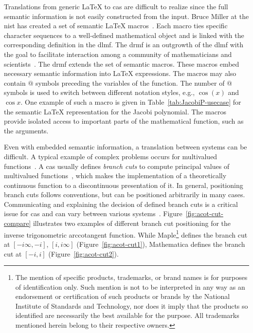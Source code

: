\documentclass[a4paper,11pt]{article}
\newcommand{\Maple}{Maple}
\newcommand{\Mathematica}{Mathematica}
\theoremstyle{defTheoStyle}
\theoremstyle{defExampStyle}
\DeclareRobustCommand{\iunit}{{i}}
\begin{document}
Translations from generic \LaTeX{} to \gls*{cas} are difficult to realize since the full semantic information is not easily constructed from the input. Bruce Miller at the \gls*{nist} has created a set of semantic \LaTeX{} macros~\parencite{DLMF:Macros}. Each macro ties specific character sequences to a well-defined mathematical object and is linked with the corresponding definition in the \gls*{dlmf}. The \gls*{drmf} is an outgrowth of the \gls*{dlmf} with the goal to facilitate interaction among a community of mathematicians and scientists~\parencites{DRMF:14}{DRMF:15}. The \gls*{drmf} extends the set of semantic macros. These macros embed necessary semantic information into \LaTeX{} expressions. The macros may also contain $@$ symbols preceding the variables of the function. The number of $@$ symbols is used to switch between different notation styles, e.g., $\cos(x)$ and $\cos x$. One example of such a macro is given in Table~\ref{tab:JacobiP-usecase} for the semantic \LaTeX{} representation for the Jacobi polynomial. The macros provide isolated access to important parts of the mathematical function, such as the arguments. 

Even with embedded semantic information, a translation between systems can be difficult. A typical example of complex problems occurs for multivalued functions~\parencite{AISC:MultivaluedFunctions}. A \gls*{cas} usually defines \textit{branch cuts} to compute principal values of multivalued functions~\parencite{Maple:Cuts}, which makes the implementation of a theoretically continuous function to a discontinuous presentation of it. In general, positioning branch cuts follows conventions, but can be positioned arbitrarily in many cases. Communicating and explaining the decision of defined branch cuts is a critical issue for \gls*{cas} and can vary between various systems~\parencite{Branches:acot}. Figure~\ref{fig:acot-cut-compare} illustrates two examples of different branch cut positioning for the inverse trigonometric arccotangent function. While \Maple{}\footnote{The mention of
specific products, trademarks, or brand
names is for purposes of identification only. Such mention is not to be interpreted
in any way as an endorsement or certification of such products or brands by the
National Institute of Standards and Technology, nor does it imply that the products
so identified are necessarily the best available for the purpose. All trademarks
mentioned herein belong to their respective owners.} defines the branch cut at ${[-\iunit\infty, -\iunit]}$, ${[\iunit,\iunit\infty]}$ (Figure~\ref{fig:acot-cut1}), \Mathematica{} defines the branch cut at ${[-\iunit, \iunit]}$ (Figure~\ref{fig:acot-cut2}).
\end{document}
